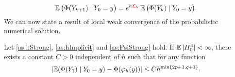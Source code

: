 \documentclass[10pt]{article}
\begin{document}
\begin{equation}\label{eq:MarkovProperty}
	\operatorname{\mathbb{E}} \big(\Phi(Y_{k+1})\mid Y_0 = y\big) = e^{h{\color{red}\mathcal{L}_h}}\operatorname{\mathbb{E}} \big(\Phi(Y_k)\mid Y_0 = y\big).
\end{equation}
We can now state a result of local weak convergence of the probabilistic numerical solution.
\begin{lemma}\label{thm:WeakLocalOrder} Let \cref{as:hStrong}, \cref{as:hImplicit} and \cref{as:PsiStrong} hold. If $\operatorname{\mathbb{E}}|H_0^4| < \infty$, there exists a constant $C > 0$ independent of $h$  such that for any function 
	\begin{equation}       
		\lvert\operatorname{\mathbb{E}}(\Phi(Y_1)\mid Y_0 = y) - \Phi(\varphi_h(y))\rvert \leq C h^{\min\{2p+1, q+1\}}.
	\end{equation}
\end{lemma}
\end{document}

